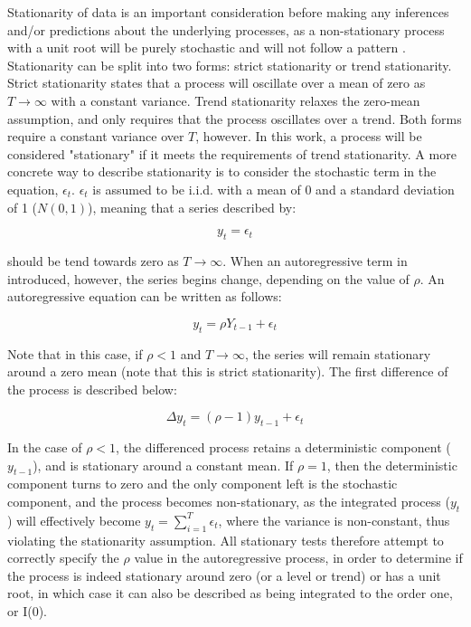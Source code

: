 Stationarity of data is an important consideration before making any inferences and/or predictions about the underlying processes, as a non-stationary process with a unit root will be purely stochastic and will not follow a pattern \citep{dickey1986unit}. Stationarity can be split into two forms: strict stationarity or trend stationarity. Strict stationarity states that a process will oscillate over a mean of zero as $T \to \infty$ with a constant variance. Trend stationarity relaxes the zero-mean assumption, and only requires that the process oscillates over a trend. Both forms require a constant variance over $T$, however. In this work, a process will be considered "stationary" if it meets the requirements of trend stationarity. A more concrete way to describe stationarity is to consider the stochastic term in the equation, $\epsilon_t$. $\epsilon_t$ is assumed to be i.i.d. with a mean of 0 and a standard deviation of 1 ($N(0,1)$), meaning that a series described by:

\begin{equation}
	y_t = \epsilon_t
\end{equation}

should be tend towards zero as $T \to \infty$. When an autoregressive term in introduced, however, the series begins change, depending on the value of $\rho$. An autoregressive equation can be written as follows:

\begin{equation}
y_t = \rho Y_{t-1} + \epsilon_t
\end{equation}

Note that in this case, if $\rho < 1 $ and $T \to \infty$, the series will remain stationary around a zero mean (note that this is strict stationarity). The first difference of the process is described below:

\begin{equation}
	\Delta y_t = (\rho - 1) y_{t-1} + \epsilon_t
\end{equation}

In the case of $\rho < 1$, the differenced process retains a deterministic component ($y_{t-1}$), and is stationary around a constant mean. If $\rho = 1$, then the deterministic component turns to zero and the only component left is the stochastic component, and the process becomes non-stationary, as the integrated process ($y_t$) will effectively become $y_t = \sum_{i=1}^{T}\epsilon_t$, where the variance is non-constant, thus violating the stationarity assumption. All stationary tests therefore attempt to correctly specify the $\rho$ value in the autoregressive process, in order to determine if the process is indeed stationary around zero (or a level or trend) or has a unit root, in which case it can also be described as being integrated to the order one, or I(0).

